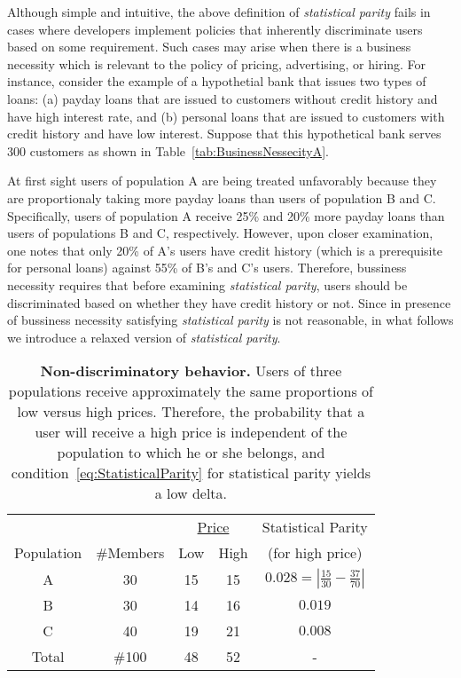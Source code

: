Although simple and intuitive, the above definition of {\em statistical parity}
fails in cases where developers implement policies that inherently discriminate
users based on some requirement. Such cases may arise when there is a
business necessity which is relevant to the policy of pricing, advertising,
or hiring. For instance, consider the example of a hypothetial bank that issues
two types of loans: (a) payday loans that are issued to customers without credit
history and have high interest rate, and (b) personal loans that are issued to
customers with credit history and have low interest. Suppose that this
hypothetical bank serves 300 customers as shown in
Table~\ref{tab:BusinessNessecityA}.

At first sight users of population A are being treated unfavorably because they
are proportionaly taking more payday loans than users of population B and C.
Specifically, users of population A
receive 25\% and 20\% more payday loans than users of populations B and C,
respectively. However, upon closer examination, one notes that only 20\% of A’s
users have credit history (which is a prerequisite for personal loans) against
55\% of B’s and C’s users. Therefore, bussiness necessity requires that before
examining {\em statistical parity}, users should be discriminated based on whether
they have credit history or not. Since in presence of bussiness necessity 
satisfying {\em statistical parity} is not reasonable, in what follows we introduce
a relaxed version of {\em statistical parity}.

\begin{table}[t]
{\scriptsize
  \renewcommand{\arraystretch}{1.5}
  \begin{tabular}{ c | c | c  c | c }
    & & \multicolumn{2}{|c|}{\underline{Price}} &  Statistical Parity\\
    Population & \#Members & Low & High & (for high price) \\
    \hline
    A & 30 &  15 & 15 & $0.028 = | \frac{15}{30} - \frac{37}{70}|$ \\
    B & 30 &  14 & 16 & $0.019$ \\
    C & 40 &  19 & 21 & $0.008$ \\
    \hline
    Total & \#100 & 48 & 52 & - \\
  \end{tabular}
  \caption{{\bf Non-discriminatory behavior.} Users of three populations receive approximately
  the same proportions of low versus high prices. Therefore, the probability that a user
  will receive a high price is independent of the population to which he or she belongs,
  and condition~\ref{eq:StatisticalParity} for statistical parity yields a low delta.}
  \label{tab:NonDiscriminationExample}
}
\end{table}




